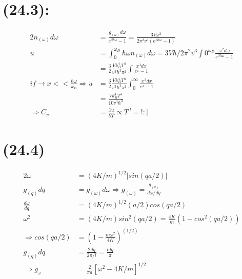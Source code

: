 \begin{latin}
    \section*{(24.3):}
    \begin{alignat*}{2}
        n_{(\omega)}d\omega &= \frac{g_{(\omega)}d\omega}{e^{\beta \hbar \omega} - 1} = \frac{3V\omega^2}{2\pi^2v^3(e^{\beta \hbar \omega} - 1)}\\
        u &= \int_0^{\omega_D}\hbar \omega n_{(\omega)}d\omega = 3V\hbar/2\pi^2v^3\int0^{\omega_D} \frac{\omega^2 d\omega}{e^{\beta \hbar \omega}-1}\\
        &= \frac{3}{2}\frac{Vk_B^4 T^4}{v^3\hbar^3\pi^2}\int \frac{x^3 dx}{e^x -1}\\
        if \to x << \frac{\hbar \omega}{k_B} \Rightarrow u &=  \frac{3}{2}\frac{Vk_B^4 T^4}{v^3\hbar^3\pi^2}\int_0^\infty \frac{x^3 dx}{e^x -1}\\
        &= \frac{Vk_B^4 T^4}{10 v^3\hbar^3}\\
        \Longrightarrow C_v &= \frac{\partial u}{\partial T} \propto T^d =! :|
    \end{alignat*}

    \section*{(24.4)}
    \begin{alignat*}{2}
        \omega &= (4K/m)^{1/2}|sin(qa/2)| \\
        g_{(q)}dq &= g_{(\omega)}d\omega \Rightarrow g_{(\omega)} = \frac{g_{(q)}}{d\omega/dq}\\
        \frac{d\omega}{dq}  &= (4K/m)^{1/2}(a/2)cos(qa/2)\\
        \omega^2  &= (4K/m)sin^2(qa/2) = \frac{4K}{m}(1 - cos^2(qa/2))\\
        \Rightarrow cos(qa/2) &= (1 - \frac{m\omega^2}{4K})^(1/2)\\
        g_{(q)}dq &= \frac{2dq}{2\pi/l} = \frac{ldq}{\pi}\\
        \Longrightarrow g_{\omega} &= \frac{2}{\pi a}[\omega^2 - 4K/m]^{1/2}
    \end{alignat*}


\end{latin} 